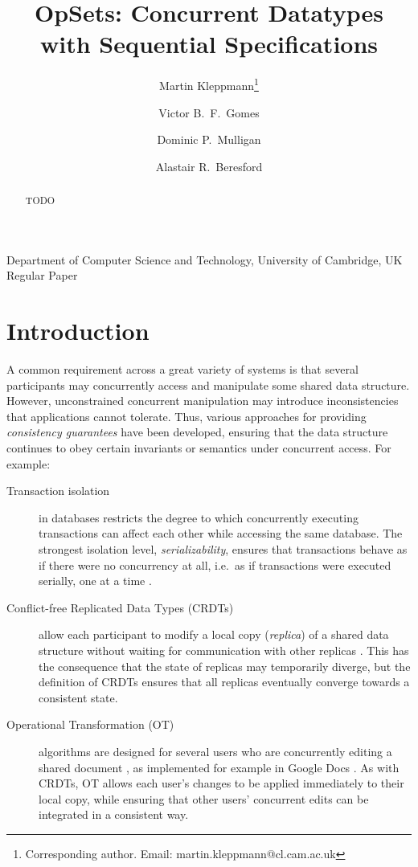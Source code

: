 \documentclass[11pt]{article}
\begin{document}
\sloppy
\title{OpSets: Concurrent Datatypes with Sequential Specifications}
\author{Martin Kleppmann\thanks{Corresponding author. Email: martin.kleppmann@cl.cam.ac.uk}
\and Victor B.\ F.\ Gomes \and Dominic P.\ Mulligan \and Alastair R.\ Beresford}
\date{}
\maketitle\vspace{-2.5em}
\begin{center}
Department of Computer Science and Technology, University of Cambridge, UK\\[1em]
Regular Paper
\end{center}
\vspace{2em}

\begin{abstract}
TODO
\end{abstract}
\clearpage

\section{Introduction}

A common requirement across a great variety of systems is that several participants may concurrently access and manipulate some shared data structure.
However, unconstrained concurrent manipulation may introduce inconsistencies that applications cannot tolerate.
Thus, various approaches for providing \emph{consistency guarantees} have been developed, ensuring that the data structure continues to obey certain invariants or semantics under concurrent access. For example:

\begin{description}
\item[Transaction isolation] in databases restricts the degree to which concurrently executing transactions can affect each other while accessing the same database.
The strongest isolation level, \emph{serializability}, ensures that transactions behave as if there were no concurrency at all, i.e.\ as if transactions were executed serially, one at a time \cite{Kleppmann:2017wj}.

\item[Conflict-free Replicated Data Types (CRDTs)] allow each participant to modify a local copy (\emph{replica}) of a shared data structure without waiting for communication with other replicas \cite{Shapiro:2011wy,Shapiro:2011un}.
This has the consequence that the state of replicas may temporarily diverge, but the definition of CRDTs ensures that all replicas eventually converge towards a consistent state.

\item[Operational Transformation (OT)] algorithms are designed for several users who are concurrently editing a shared document \cite{Ellis:1989ue,Sun:1998un}, as implemented for example in Google Docs \cite{DayRichter:2010tt}.
As with CRDTs, OT allows each user's changes to be applied immediately to their local copy, while ensuring that other users' concurrent edits can be integrated in a consistent way.
\end{description}
\end{document}
